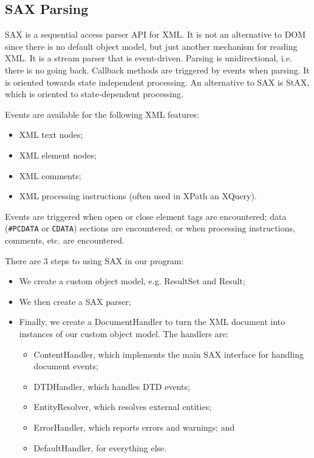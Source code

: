 \documentclass[a4paper, openany]{memoir}
\begin{document}
\subsection{SAX Parsing}
SAX is a sequential access parser API for XML. It is not an alternative to DOM since there is no default object model, but just another mechanism for reading XML. It is a stream parser that is event-driven. Parsing is unidirectional, i.e. there is no going back. Callback methods are triggered by events when parsing. It is oriented towards state independent processing. An alternative to SAX is StAX, which is oriented to state-dependent processing.

Events are available for the following XML features:
\begin{itemize}
    \item XML text nodes;
    \item XML element nodes;
    \item XML comments;
    \item XML processing instructions (often used in XPath an XQuery).
\end{itemize}
Events are triggered when open or close element tags are encountered; data (\texttt{\#PCDATA} or \texttt{CDATA}) sections are encountered; or when processing instructions, comments, etc. are encountered.

There are 3 steps to using SAX in our program:
\begin{itemize}
    \item We create a custom object model, e.g. ResultSet and Result;
    \item We then create a SAX parser;
    \item Finally, we create a DocumentHandler to turn the XML document into instances of our custom object model. The handlers are:
    \begin{itemize}
        \item ContentHandler, which implements the main SAX interface for handling document events;
        \item DTDHandler, which handles DTD events;
        \item EntityResolver, which resolves external entities;
        \item ErrorHandler, which reports errors and warnings; and
        \item DefaultHandler, for everything else.
    \end{itemize}
\end{itemize}
\end{document}
